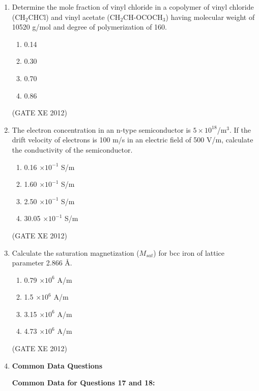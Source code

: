 \documentclass[12pt]{article}
\begin{document}
\begin{enumerate}
 \item Determine the mole fraction of vinyl chloride in a copolymer of vinyl chloride (CH$_2$CHCl) and vinyl acetate (CH$_2$CH-OCOCH$_3$) having molecular weight of 10520 g/mol and degree of polymerization of 160.
  \begin{multicols}{4}
    \begin{enumerate}
      \item 0.14
      \item 0.30
      \item 0.70
      \item 0.86
    \end{enumerate}
  \end{multicols}
  (GATE XE 2012)

  \item The electron concentration in an n-type semiconductor is $5 \times 10^{18}$/m$^3$. If the drift velocity of electrons is 100 m/s in an electric field of 500 V/m, calculate the conductivity of the semiconductor.
  \begin{multicols}{4}
    \begin{enumerate}
      \item 0.16 $\times 10^{-1}$ S/m
      \item 1.60 $\times 10^{-1}$ S/m
      \item 2.50 $\times 10^{-1}$ S/m
      \item 30.05 $\times 10^{-1}$ S/m
    \end{enumerate}
  \end{multicols}
  (GATE XE 2012)

  \item Calculate the saturation magnetization ($M_{sat}$) for bcc iron of lattice parameter 2.866 \AA.
  \begin{multicols}{4}
    \begin{enumerate}
      \item 0.79 $\times 10^6$ A/m
      \item 1.5 $\times 10^6$ A/m
      \item 3.15 $\times 10^6$ A/m
      \item 4.73 $\times 10^6$ A/m
    \end{enumerate}
  \end{multicols}
  (GATE XE 2012)

  \item[] {\large \textbf{Common Data Questions}} 
  
  \textbf{Common Data for Questions 17 and 18:}
  

\end{enumerate}
\end{document}
